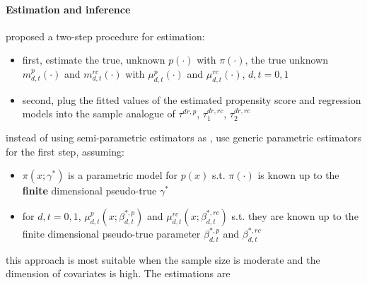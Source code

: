 \documentclass[twoside]{article}
\begin{document}
\paragraph*{Estimation and inference} 
\citet{sant2020doubly} proposed a two-step procedure for estimation:
\begin{itemize}
    \item first, estimate the true, unknown $p(\cdot)$ with $\pi(\cdot)$, the true unknown $m^p_{d,t}(\cdot)$ and $m^{rc}_{d,t}(\cdot)$ with $\mu^p_{d,t}(\cdot)$ and $\mu^{rc}_{d,t}(\cdot)$, $d,t=0,1$
    \item second, plug the fitted values of the estimated propensity score and regression models into the sample analogue of $\tau^{dr,p}$, $\tau^{dr,rc}_1$, $\tau^{dr,rc}_2$
\end{itemize}
instead of using semi-parametric estimators as \citet{abadie2005semiparametric}, \citet{sant2020doubly} use generic parametric estimators for the first step, assuming:
\begin{itemize}
    \item $\pi\left(x;\gamma^*\right)$ is a parametric model for $p(x)$ s.t. $\pi(\cdot)$ is known up to the \textbf{finite} dimensional pseudo-true $\gamma^*$
    \item for $d,t=0,1$, $\mu^p_{d,t}\left(x;\beta^{*,p}_{d,t}\right)$ and $\mu^{rc}_{d,t}\left(x;\beta^{*,rc}_{d,t}\right)$ s.t. they are known up to the finite dimensional pseudo-true parameter $\beta^{*,p}_{d,t}$ and $\beta^{*,rc}_{d,t}$
\end{itemize}
this approach is most suitable when the sample size is moderate and the dimension of covariates is high. The estimations are 
\end{document}
